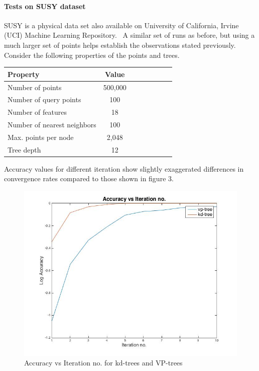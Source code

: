 \documentclass[11pt]{article}
\begin{document}
\paragraph{Tests on SUSY dataset} SUSY is a physical data set also available on University of California, Irvine (UCI) Machine Learning Repository.~\cite{Whiteson2014} A similar set of runs as before, but using a much larger set of points helps establish the observations stated previously. Consider the following properties of the points and trees.
\begin{center}
\begin{tabular}{l*{6}{c}r} Property & Value \\ 
\hline 
Number of points & 500,000 \\ 
Number of query points & 100 \\ 
Number of features & 18 \\ 
Number of nearest neighbors & 100 \\ 
Max. points per node & 2,048 \\
Tree depth & 12 \\
\end{tabular}
 \label{tab:results_susy}
\end{center}
Accuracy values for different iteration show slightly exaggerated differences in convergence rates compared to those shown in figure 3. 
\begin{figure}[h]
\centering
\includegraphics[scale=0.5]{./images/kdvsvpsusy.jpg}
\caption{Accuracy vs Iteration no. for kd-trees and VP-trees}
\label{fig:vpvskdsusy}
\end{figure}
\end{document}
